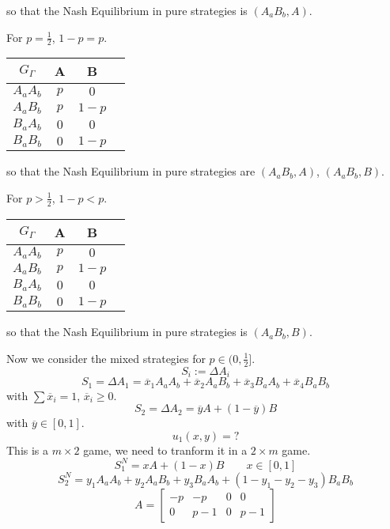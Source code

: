 \documentclass[a4paper, twoside, openany]{book}
\renewcommand{\Gamma}{\varGamma}
\begin{document}
so that the Nash Equilibrium in pure strategies is $(A_aB_b, A)$. \par   
For $p = \frac{1}{2}$, $1 - p = p$.
\begin{center}
\begin{tabular}{|c | c | c| c| }
\hline
$G_{\Gamma}$ & A & B   \\
\hline
$A_a A_b$ & \underline{$p$} & \underline{$0$}\\
\hline 
$A_a B_b$ & \underline{\underline{$p$}} &  \underline{\underline{$1 - p$}}\\
\hline  
$B_a A_b$ & \underline{$0$} &  \underline{$0$}\\  
\hline 
$B_a B_b$ & \underline{$0$} &  \underline{$1 - p$}\\
\hline
\end{tabular}
\end{center}
so that the Nash Equilibrium in pure strategies are $(A_aB_b, A)$, $(A_aB_b, B)$. \par 
For $p > \frac{1}{2}$, $1 - p < p$.
\begin{center}
\begin{tabular}{|c | c | c| c| }
\hline
$G_{\Gamma}$ & A & B   \\
\hline
$A_a A_b$ & \underline{$p$} & \underline{$0$}\\
\hline 
$A_a B_b$ & \underline{$p$} &  \underline{\underline{$1 - p$}}\\
\hline  
$B_a A_b$ & \underline{$0$} &  \underline{$0$}\\  
\hline 
$B_a B_b$ & \underline{$0$} &  \underline{$1 - p$}\\
\hline
\end{tabular}
\end{center}
so that the Nash Equilibrium in pure strategies is $(A_aB_b, B)$. \par 
Now we consider the mixed strategies for $p \in (0, \frac{1}{2}]$.
$$S_i := \Delta A_i$$
$$S_1 = \Delta A_1 = \overline{x}_1 A_a A_b + \overline{x}_2 A_a B_b + \overline{x}_3 B_a A_b + \overline{x}_4 B_a B_b$$
with $\sum \overline{x}_i = 1$, $\overline{x}_i \geq 0$.
$$S_2 = \Delta A_2 = \overline{y} A + (1 - \overline{y})B$$
with $\overline{y} \in [0, 1]$.
$$u_1(x, y) = ?$$
This is a $m \times 2$ game, we need to tranform it in a $2 \times m$ game.
$$S^N_1 = xA + (1 - x)B \qquad x \in [0, 1]$$
$$S^N_2 = y_1 A_a A_b + y_2 A_a B_b + y_3 B_a A_b + (1 - y_1 - y_2 - y_3)B_a B_b$$
$$A = \begin{bmatrix}
		-p & -p & 0 & 0 \\
		0 & p-1 & 0 & p-1
	  \end{bmatrix}$$
\end{document}
